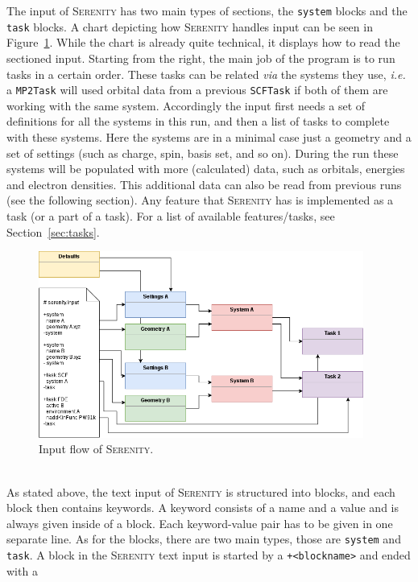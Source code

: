 \documentclass[bibliography=totocnumbered,a4paper,10pt]{scrartcl}
\newcommand{
\serenity}{\textsc{Serenity}\xspace}
\begin{document}
The input of \serenity has two main types of sections, the \texttt{system} blocks and the \texttt{task} blocks.
A chart depicting how \serenity handles input can be seen in Figure~\ref{fig:input}. 
While the chart is already quite technical, it displays how to read the sectioned input.
Starting from the right, the main job of the program is to run tasks in a certain order.
These tasks can be related \textit{via} the systems they use, \textit{i.e.} a \texttt{MP2Task} will used
orbital data from a previous \texttt{SCFTask} if both of them are working with the same system.
Accordingly the input first needs a set of definitions for all the systems in this run, and then
a list of tasks to complete with these systems.
Here the systems are in a minimal case just a geometry and a set of settings (such as charge, spin, basis set, and so on).
During the run these systems will be populated with more (calculated) data, such as orbitals, energies and electron densities.
This additional data can also be read from previous runs (see the following section).
Any feature that \serenity has is implemented as a task (or a part of a task).
For a list of available features/tasks, see Section~\ref{sec:tasks}.
\begin{figure}[h!]
\label{fig:input}
\includegraphics[width=0.95\textwidth]{./figs/SerenityInput.png}
\caption{Input flow of \serenity.}
\end{figure}\\
As stated above, the text input of \serenity is structured into blocks, and each block then contains keywords.
A keyword consists of a name and a value and is always given inside of a block. 
Each keyword-value pair has to be given in one separate line. 
As for the blocks, there are two main types, those are \texttt{system} and \texttt{task}. 
A block in the {\serenity} text input is started by a \texttt{+<blockname>} and ended with a
\end{document}
